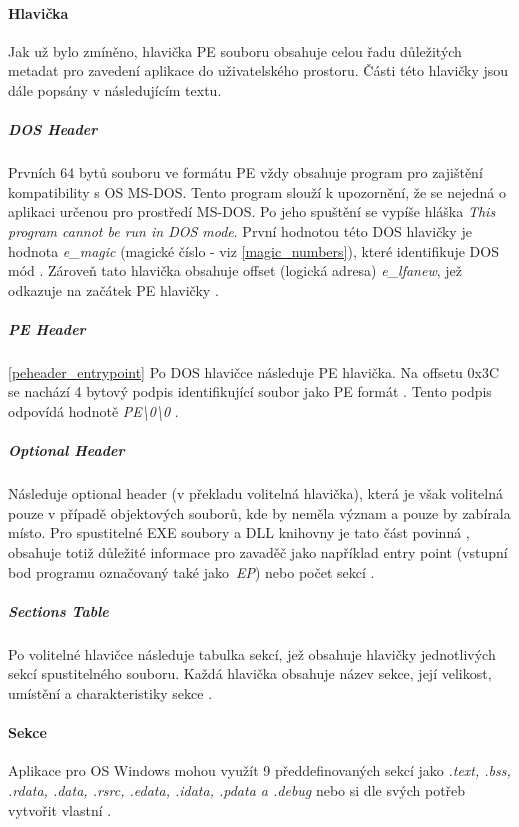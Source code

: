 \paragraph*{Hlavička} Jak už bylo zmíněno, hlavička PE souboru obsahuje celou řadu důležitých metadat pro zavedení aplikace do uživatelského prostoru. Části této hlavičky jsou dále popsány v následujícím textu.

\subparagraph*{DOS Header}
Prvních 64 bytů souboru ve formátu PE vždy obsahuje program pro zajištění kompatibility s OS MS-DOS. Tento program slouží k upozornění, že se nejedná o aplikaci určenou pro prostředí MS-DOS. Po jeho spuštění se vypíše hláška \emph{This program cannot be run in DOS mode}. První hodnotou této DOS hlavičky je hodnota \emph{e\_magic} (magické číslo - viz \ref{magic_numbers}), které identifikuje DOS mód \cite{Zatloukal2017MalwareDB}. Zároveň tato hlavička obsahuje offset (logická adresa) \emph{e\_lfanew}, jež odkazuje na začátek PE hlavičky \cite{pe_format_history}.

\subparagraph*{PE Header} \ref{peheader_entrypoint}
Po DOS hlavičce následuje PE hlavička. Na offsetu 0x3C se nachází 4 bytový podpis identifikující soubor jako PE formát \cite{Liao2012PEHeaderBasedMS}. Tento podpis odpovídá hodnotě \emph{PE\textbackslash0\textbackslash0} \cite{msdocs_pe}.

\subparagraph*{Optional Header}
Následuje optional header (v překladu volitelná hlavička), která je však volitelná pouze v případě objektových souborů, kde by neměla význam a pouze by zabírala místo. Pro spustitelné EXE soubory a DLL knihovny je tato část povinná \cite{msdocs_pe}, obsahuje totiž důležité informace pro zavaděč jako například entry point (vstupní bod programu označovaný také jako~\emph{EP}) nebo počet sekcí \cite{pe_format_history}. 

\subparagraph*{Sections Table}

Po volitelné hlavičce následuje tabulka sekcí, jež obsahuje hlavičky jednotlivých sekcí spustitelného souboru. Každá hlavička obsahuje název sekce, její velikost, umístění a charakteristiky sekce \cite{infosecinstitute_pe}.

\paragraph*{Sekce}
Aplikace pro OS Windows mohou využít 9 předdefinovaných sekcí jako \emph{.text, .bss, .rdata, .data, .rsrc, .edata, .idata, .pdata a .debug} nebo si dle svých potřeb vytvořit vlastní \cite{pe_format_history}. 

